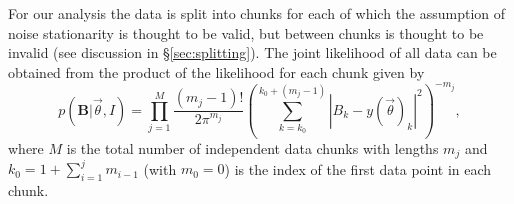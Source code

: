 For our analysis the data is split into chunks for each of which the assumption of noise stationarity is
thought to be valid, but between chunks is thought to be invalid (see discussion in \S\ref{sec:splitting}). The joint likelihood of all data can be
obtained from the product of the likelihood for each chunk given by
\begin{equation}\label{eq:prod}
p(\mathbf{B}|\vec{\theta},I) = \prod_{j=1}^M \frac{(m_j-1)!}{2\pi^{m_j}}
\left(\sum_{k=k_0}^{k_0+(m_j-1)} |B_k-y(\vec{\theta})_k|^2\right)^{-m_j},
\end{equation}
where $M$ is the total number of independent data chunks with lengths $m_j$ and $k_0 = 1+\sum_{i=1}^{j}
m_{i-1}$ (with $m_0 = 0$) is the index of the first data point in each chunk.

  
  
  